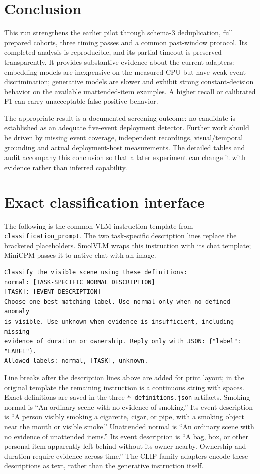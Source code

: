\documentclass[11pt,a4paper]{article}
\newcommand{\code}[1]{\nolinkurl{#1}}
\begin{document}
\section{Conclusion}
This run strengthens the earlier pilot through schema-3 deduplication, full prepared cohorts, three timing passes and a common past-window protocol. Its completed analysis is reproducible, and its partial timeout is preserved transparently. It provides substantive evidence about the current adapters: embedding models are inexpensive on the measured CPU but have weak event discrimination; generative models are slower and exhibit strong constant-decision behavior on the available unattended-item examples. A higher recall or calibrated F1 can carry unacceptable false-positive behavior.

The appropriate result is a documented screening outcome: no candidate is established as an adequate five-event deployment detector. Further work should be driven by missing event coverage, independent recordings, visual/temporal grounding and actual deployment-host measurements. The detailed tables and audit accompany this conclusion so that a later experiment can change it with evidence rather than inferred capability.

\appendix
\clearpage
\section{Exact classification interface}\label{app:prompt}
The following is the common VLM instruction template from \code{classification_prompt}. The two task-specific description lines replace the bracketed placeholders. SmolVLM wraps this instruction with its chat template; MiniCPM passes it to native chat with an image.
\begin{verbatim}
Classify the visible scene using these definitions:
normal: [TASK-SPECIFIC NORMAL DESCRIPTION]
[TASK]: [EVENT DESCRIPTION]
Choose one best matching label. Use normal only when no defined anomaly
is visible. Use unknown when evidence is insufficient, including missing
evidence of duration or ownership. Reply only with JSON: {"label": "LABEL"}.
Allowed labels: normal, [TASK], unknown.
\end{verbatim}
Line breaks after the description lines above are added for print layout; in the original template the remaining instruction is a continuous string with spaces. Exact definitions are saved in the three \code{*_definitions.json} artifacts. Smoking normal is ``An ordinary scene with no evidence of smoking.'' Its event description is ``A person visibly smoking a cigarette, cigar, or pipe, with a smoking object near the mouth or visible smoke.'' Unattended normal is ``An ordinary scene with no evidence of unattended items.'' Its event description is ``A bag, box, or other personal item apparently left behind without its owner nearby. Ownership and duration require evidence across time.'' The CLIP-family adapters encode these descriptions as text, rather than the generative instruction itself.
\end{document}
